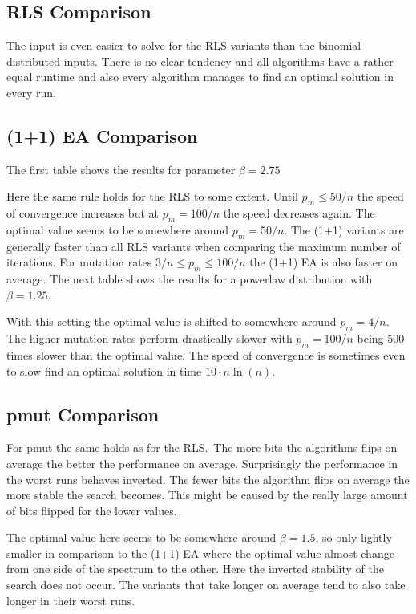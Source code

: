 \subsection{RLS Comparison}


The input is even easier to solve for the RLS variants than the binomial distributed inputs.
There is no clear tendency and all algorithms have a rather equal runtime and also every algorithm manages to find an optimal solution in every run.
\subsection{(1+1) EA Comparison}
The first table shows the results for parameter $\beta=2.75$



Here the same rule holds for the RLS to some extent.
Until $p_m\le50/n$ the speed of convergence increases but at $p_m=100/n$ the speed decreases again.
The optimal value seems to be somewhere around $p_m=50/n$.
The (1+1) variants are generally faster than all RLS variants when comparing the maximum number of iterations.
For mutation rates $3/n\le p_m \le 100/n$ the (1+1) EA is also faster on average.
The next table shows the results for a powerlaw distribution with $\beta=1.25$.



With this setting the optimal value is shifted to somewhere around $p_m=4/n$.
The higher mutation rates perform drastically slower with $p_m=100/n$ being 500 times slower than the optimal value.
The speed of convergence is sometimes even to slow find an optimal solution in time $10\cdot n\ln(n)$.
\subsection{pmut Comparison}
For pmut the same holds as for the RLS.\
The more bits the algorithms flips on average the better the performance on average.
Surprisingly the performance in the worst runs behaves inverted.
The fewer bits the algorithm flips on average the more stable the search becomes.
This might be caused by the really large amount of bits flipped for the lower values.



The optimal value here seems to be somewhere around $\beta=1.5$, so only lightly smaller in comparison to the (1+1) EA where the optimal value almost change from one side of the spectrum to the other.
Here the inverted stability of the search does not occur.
The variants that take longer on average tend to also take longer in their worst runs.

